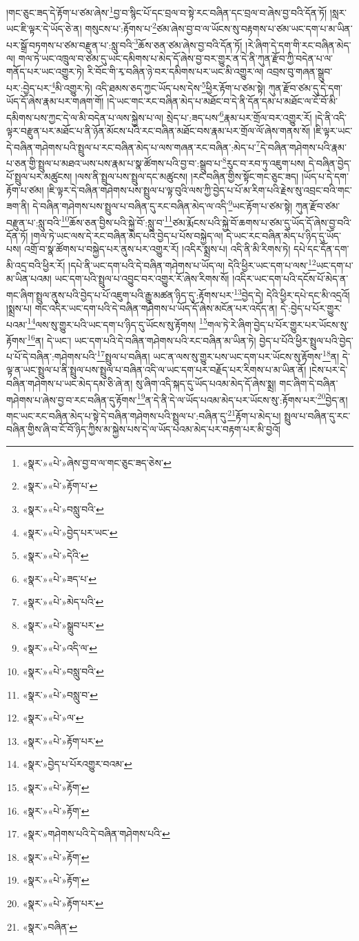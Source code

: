 །གང་ཅུང་ཟད་དེ་རྟོག་པ་ཙམ་ཞེས་\footnote{«སྣར་»«པེ་»ཞེས་བྱ་བ་ལ་གང་ཅུང་ཟད་ཅེས་}བྱ་བ་སྙིང་པོ་དང་བྲལ་བ་སྟེ་རང་བཞིན་དང་བྲལ་བ་ཞེས་བྱ་བའི་དོན་ཏོ། །སླར་ཡང་ཇི་ལྟར་དེ་ཡོད་ཅེ་ན། གསུངས་པ་:རྟོགས་པ་\footnote{«སྣར་»«པེ་»རྟོག་པ་}ཙམ་ཞེས་བྱ་བ་ལ་ཡོངས་སུ་བརྟགས་པ་ཙམ་ཡང་དག་པ་མ་ཡིན་པར་སྒྲོ་བཏགས་པ་ཙམ་བརྫུན་པ་:སླུ་བའི་\footnote{«སྣར་»«པེ་»བསླུ་བའི་}ཆོས་ཅན་ཙམ་ཞེས་བྱ་བའི་དོན་ཏོ། །རེ་ཞིག་དེ་དག་གི་རང་བཞིན་མེད་ལ། གལ་ཏེ་ཡང་འཁྲུལ་བ་ཙམ་དུ་ཡང་དམིགས་པ་མེད་དོ་ཞེས་བྱ་བར་གྱུར་ན་དེ་ནི་ཀུན་རྫོབ་ཀྱི་བདེན་པ་ལ་གནོད་པར་ཡང་འགྱུར་ཏེ། རི་བོང་གི་རྭ་བཞིན་ཉེ་བར་དམིགས་པར་ཡང་མི་འགྱུར་ལ། འབྲས་བུ་གཞན་སྒྲུབ་པར་:བྱེད་པར་\footnote{«སྣར་»«པེ་»བྱེད་པར་ཡང་}མི་འགྱུར་ཏེ། འདི་ཐམས་ཅད་ཀྱང་ཡོད་པས་དེས་\footnote{«སྣར་»«པེ་»དེའི་}ཕྱིར་རྟོག་པ་ཙམ་སྟེ། ཀུན་རྫོབ་ཙམ་དུ་དེ་དག་ཡོད་དོ་ཞེས་རྣམ་པར་གཞག་གོ། །དེ་ཡང་གང་རང་བཞིན་མེད་པ་མཐོང་བ་དེ་ནི་དོན་དམ་པ་མཐོང་ལ་ངོ་བོ་མི་དམིགས་པས་ཀྱང་དེ་ལ་མི་བདེན་པ་ལས་སྐྱེས་པ་ལ། སྲེད་པ་:ཟད་པས་\footnote{«སྣར་»«པེ་»ཟད་པ་}རྣམ་པར་གྲོལ་བར་འགྱུར་རོ། །དེ་ནི་འདི་ལྟར་བརྫུན་པར་མཐོང་པ་ནི་ཉོན་མོངས་པའི་རང་བཞིན་མཐོང་བས་རྣམ་པར་གྲོལ་ལོ་ཞེས་གནས་སོ། །ཇི་ལྟར་ཡང་དེ་བཞིན་གཤེགས་པའི་སྤྲུལ་པ་རང་བཞིན་མེད་པ་ལས་གཞན་རང་བཞིན་:མེད་པ་\footnote{«སྣར་»«པེ་»མེད་པའི་}དེ་བཞིན་གཤེགས་པའི་རྣམ་པ་ཅན་གྱི་སྤྲུལ་པ་མཐའ་ཡས་པས་རྣམ་པ་སྣ་ཚོགས་པའི་བྱ་བ་:སྒྲུབ་པ་\footnote{«སྣར་»«པེ་»སྒྲུབ་པར་}རུང་བ་རབ་ཏུ་འཇུག་པས། དེ་བཞིན་བྱེད་པོ་སྤྲུལ་པར་མཚུངས། །ལས་ནི་སྤྲུལ་པས་སྤྲུལ་དང་མཚུངས། །རང་བཞིན་གྱིས་སྟོང་གང་ཅུང་ཟད། །ཡོད་པ་དེ་དག་རྟོག་པ་ཙམ། །ཇི་ལྟར་དེ་བཞིན་གཤེགས་པས་སྤྲུལ་པ་ལྟ་བུའི་ལས་ཀྱི་བྱེད་པ་པོ་མ་རིག་པའི་རྗེས་སུ་འབྲང་བའི་གང་ཟག་ནི། དེ་བཞིན་གཤེགས་པས་སྤྲུལ་པ་བཞིན་དུ་རང་བཞིན་མེད་ལ་འདི་\footnote{«སྣར་»«པེ་»འདི་ལ་}ཡང་རྟོག་པ་ཙམ་སྟེ། ཀུན་རྫོབ་ཙམ་བརྫུན་པ་:སླུ་བའི་\footnote{«སྣར་»«པེ་»བསླུ་བའི་}ཆོས་ཅན་བྱིས་པའི་སྐྱེ་བོ་:སླུ་བ་\footnote{«སྣར་»«པེ་»བསླུ་བ་}ཙམ་རྨོངས་པའི་སྐྱེ་བོ་ཆགས་པ་ཙམ་དུ་ཡོད་དོ་ཞེས་བྱ་བའི་དོན་ཏོ། །གལ་ཏེ་ཡང་ལས་དེ་རང་བཞིན་མེད་པའི་བྱེད་པ་པོས་བསྐྱེད་ལ། དེ་ཡང་རང་བཞིན་མེད་པ་ཉིད་དུ་ཡོད་པས། འགྲོ་བ་སྣ་ཚོགས་པ་བསྐྱེད་པར་ནུས་པར་འགྱུར་རོ། །འདིར་སྨྲས་པ། འདི་ནི་མི་རིགས་ཏེ། དཔེ་དང་དོན་དག་མི་འདྲ་བའི་ཕྱིར་རོ། །དཔེ་ནི་ཡང་དག་པའི་དེ་བཞིན་གཤེགས་པ་ཡོད་ལ། དེའི་ཕྱིར་ཡང་དག་པ་ལས་\footnote{«སྣར་»«པེ་»ལ་}ཡང་དག་པ་མ་ཡིན་པའམ། ཡང་དག་པའི་སྤྲུལ་པ་འབྱུང་བར་འགྱུར་རོ་ཞེས་རིགས་སོ། །འདིར་ཡང་དག་པའི་དངོས་པོ་མེད་ན་གང་ཞིག་སྤྲུལ་ནུས་པའི་བྱེད་པ་པོ་འཇུག་པའི་རྒྱུ་མཚན་ཉིད་དུ་:རྟོགས་པར་\footnote{«སྣར་»«པེ་»རྟོག་པར་}བྱེད་དེ། དེའི་ཕྱིར་དཔེ་དང་མི་འདྲའོ། །སྨྲས་པ། གང་འདིར་ཡང་དག་པའི་དེ་བཞིན་གཤེགས་པ་ཡོད་དོ་ཞེས་མངོན་པར་འདོད་ན། དེ་:བྱེད་པ་པོར་གྱུར་པའམ་\footnote{«སྣར་»བྱེད་པ་པོརའགྱུར་བའམ་}ལས་སུ་གྱུར་པའི་ཡང་དག་པ་ཉིད་དུ་ཡོངས་སུ་རྟོགས། \footnote{«སྣར་»«པེ་»རྟོག་}གལ་ཏེ་རེ་ཞིག་བྱེད་པ་པོར་གྱུར་པར་ཡོངས་སུ་རྟོགས་\footnote{«སྣར་»«པེ་»རྟོག་}ན། དེ་ཡང་། ཡང་དག་པའི་དེ་བཞིན་གཤེགས་པའི་རང་བཞིན་མ་ཡིན་ཏེ། བྱེད་པ་པོའི་ཕྱིར་སྤྲུལ་པའི་བྱེད་པ་པོ་དེ་བཞིན་:གཤེགས་པའི་\footnote{«སྣར་»གཤེགས་པའི་དེ་བཞིན་གཤེགས་པའི་}སྤྲུལ་པ་བཞིན། ཡང་ན་ལས་སུ་གྱུར་པས་ཡང་དག་པར་ཡོངས་སུ་རྟོགས་\footnote{«སྣར་»«པེ་»རྟོག་}ན། དེ་ལྟ་ན་ཡང་སྤྲུལ་པ་ནི་སྤྲུལ་པས་སྤྲུལ་པ་བཞིན་འདི་ལ་ཡང་དག་པར་བརྗོད་པར་རིགས་པ་མ་ཡིན་ནོ། །ངེས་པར་དེ་བཞིན་གཤེགས་པ་ཡང་མེད་དམ་ཅི་ཞེ་ན། སུ་ཞིག་འདི་སྐད་དུ་ཡོད་པའམ་མེད་དོ་ཞེས་སྨྲ། གང་ཞིག་དེ་བཞིན་གཤེགས་པ་ཞེས་བྱ་བ་རང་བཞིན་དུ་རྟོགས་\footnote{«སྣར་»«པེ་»རྟོག་}ན་དེ་ནི་དེ་ལ་ཡོད་པའམ་མེད་པར་ཡོངས་སུ་:རྟོགས་པར་\footnote{«སྣར་»«པེ་»རྟོག་པར་}བྱེད་ན། གང་ཡང་རང་བཞིན་མེད་པ་སྟེ་དེ་བཞིན་གཤེགས་པའི་སྤྲུལ་པ་:བཞིན་དུ་\footnote{«སྣར་»བཞིན་}རྟོག་པ་མེད་པ། སྤྲུལ་པ་བཞིན་དུ་རང་བཞིན་གྱིས་ཞི་བ་ངོ་བོ་ཉིད་ཀྱིས་མ་སྐྱེས་པས་དེ་ལ་ཡོད་པའམ་མེད་པར་བརྟག་པར་མི་བྱའོ། 